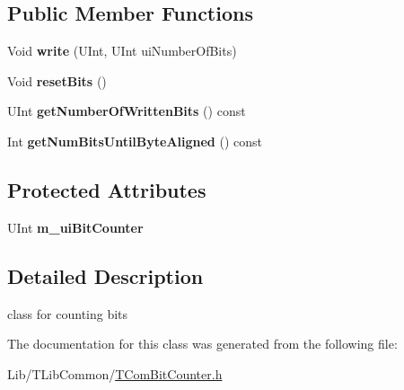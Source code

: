 \subsection*{Public Member Functions}
\begin{DoxyCompactItemize}
\item 
\mbox{\label{class_t_com_bit_counter_adbaebef7c5efaddf5849ec981750a039}} 
Void {\bfseries write} (U\+Int, U\+Int ui\+Number\+Of\+Bits)
\item 
\mbox{\label{class_t_com_bit_counter_a99157edea6d8b547d6eefbc3b25675ff}} 
Void {\bfseries reset\+Bits} ()
\item 
\mbox{\label{class_t_com_bit_counter_a2a16b29041cd88b9e6573cd408ab9184}} 
U\+Int {\bfseries get\+Number\+Of\+Written\+Bits} () const
\item 
\mbox{\label{class_t_com_bit_counter_a81d1386ed9ac56b0748d1625be9e2a43}} 
Int {\bfseries get\+Num\+Bits\+Until\+Byte\+Aligned} () const
\end{DoxyCompactItemize}
\subsection*{Protected Attributes}
\begin{DoxyCompactItemize}
\item 
\mbox{\label{class_t_com_bit_counter_a8c8862a008ca641af7eb782c5dc17997}} 
U\+Int {\bfseries m\+\_\+ui\+Bit\+Counter}
\end{DoxyCompactItemize}


\subsection{Detailed Description}
class for counting bits 

The documentation for this class was generated from the following file\+:\begin{DoxyCompactItemize}
\item 
Lib/\+T\+Lib\+Common/\hyperlink{_t_com_bit_counter_8h}{T\+Com\+Bit\+Counter.\+h}\end{DoxyCompactItemize}
